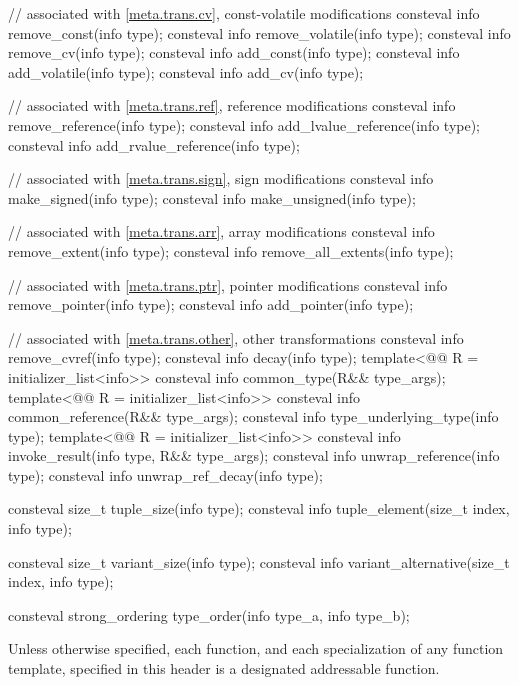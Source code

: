\begin{codeblock}
{  // associated with \ref{meta.trans.cv}, const-volatile modifications
  consteval info remove_const(info type);
  consteval info remove_volatile(info type);
  consteval info remove_cv(info type);
  consteval info add_const(info type);
  consteval info add_volatile(info type);
  consteval info add_cv(info type);

  // associated with \ref{meta.trans.ref}, reference modifications
  consteval info remove_reference(info type);
  consteval info add_lvalue_reference(info type);
  consteval info add_rvalue_reference(info type);

  // associated with \ref{meta.trans.sign}, sign modifications
  consteval info make_signed(info type);
  consteval info make_unsigned(info type);

  // associated with \ref{meta.trans.arr}, array modifications
  consteval info remove_extent(info type);
  consteval info remove_all_extents(info type);

  // associated with \ref{meta.trans.ptr}, pointer modifications
  consteval info remove_pointer(info type);
  consteval info add_pointer(info type);

  // associated with \ref{meta.trans.other}, other transformations
  consteval info remove_cvref(info type);
  consteval info decay(info type);
  template<@@ R = initializer_list<info>>
    consteval info common_type(R&& type_args);
  template<@@ R = initializer_list<info>>
    consteval info common_reference(R&& type_args);
  consteval info type_underlying_type(info type);
  template<@@ R = initializer_list<info>>
    consteval info invoke_result(info type, R&& type_args);
  consteval info unwrap_reference(info type);
  consteval info unwrap_ref_decay(info type);

  consteval size_t tuple_size(info type);
  consteval info tuple_element(size_t index, info type);

  consteval size_t variant_size(info type);
  consteval info variant_alternative(size_t index, info type);

  consteval strong_ordering type_order(info type_a, info type_b);
}
\end{codeblock}

\pnum
Unless otherwise specified,
each function, and each specialization of any function template,
specified in this header
is a designated addressable function.

